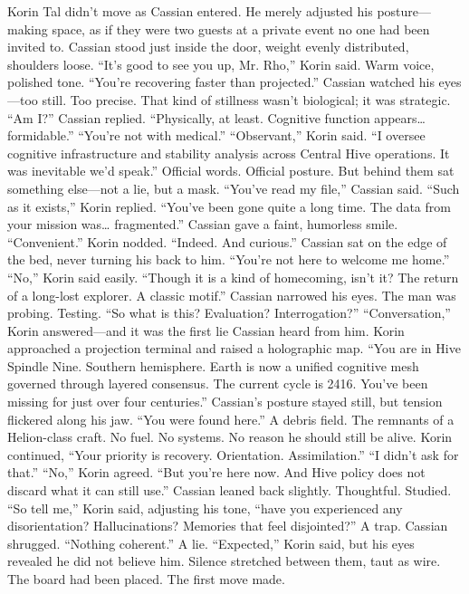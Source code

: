 \documentclass[12pt,oneside]{book}
\begin{document}
Korin Tal didn’t move as Cassian entered. He merely adjusted his posture—making space, as if they were two guests at a private event no one had been invited to.
Cassian stood just inside the door, weight evenly distributed, shoulders loose.
“It’s good to see you up, Mr. Rho,” Korin said. Warm voice, polished tone. “You’re recovering faster than projected.”
Cassian watched his eyes—too still. Too precise. That kind of stillness wasn’t biological; it was strategic.
“Am I?” Cassian replied.
“Physically, at least. Cognitive function appears… formidable.”
“You’re not with medical.”
“Observant,” Korin said. “I oversee cognitive infrastructure and stability analysis across Central Hive operations. It was inevitable we’d speak.”
Official words. Official posture. But behind them sat something else—not a lie, but a mask.
“You’ve read my file,” Cassian said.
“Such as it exists,” Korin replied. “You’ve been gone quite a long time. The data from your mission was… fragmented.”
Cassian gave a faint, humorless smile. “Convenient.”
Korin nodded. “Indeed. And curious.”
Cassian sat on the edge of the bed, never turning his back to him.
“You’re not here to welcome me home.”
“No,” Korin said easily. “Though it is a kind of homecoming, isn’t it? The return of a long-lost explorer. A classic motif.”
Cassian narrowed his eyes. The man was probing. Testing.
“So what is this? Evaluation? Interrogation?”
“Conversation,” Korin answered—and it was the first lie Cassian heard from him.
Korin approached a projection terminal and raised a holographic map.
“You are in Hive Spindle Nine. Southern hemisphere. Earth is now a unified cognitive mesh governed through layered consensus. The current cycle is 2416. You’ve been missing for just over four centuries.”
Cassian’s posture stayed still, but tension flickered along his jaw.
“You were found here.”
 A debris field. The remnants of a Helion-class craft. No fuel. No systems. No reason he should still be alive.
Korin continued, “Your priority is recovery. Orientation. Assimilation.”
“I didn’t ask for that.”
“No,” Korin agreed. “But you’re here now. And Hive policy does not discard what it can still use.”
Cassian leaned back slightly. Thoughtful.
Studied.
“So tell me,” Korin said, adjusting his tone, “have you experienced any disorientation? Hallucinations? Memories that feel disjointed?”
A trap.
Cassian shrugged. “Nothing coherent.”
A lie.
“Expected,” Korin said, but his eyes revealed he did not believe him.
Silence stretched between them, taut as wire.
The board had been placed.
The first move made.
\end{document}
